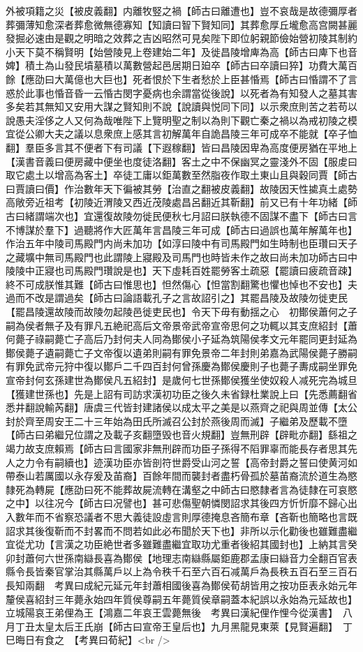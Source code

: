 外被項籍之災【被皮義翻】内離牧竪之禍【師古曰離遭也】豈不哀哉是故德彌厚者葬彌薄知愈深者葬愈微無德寡知【知讀曰智下賢知同】其葬愈厚丘壠愈高宫闕甚麗發掘必速由是觀之明暗之效葬之吉凶昭然可見矣陛下即位躬親節儉始營初陵其制約小天下莫不稱賢明【始營陵見上卷建始二年】及徙昌陵增庳為高【師古曰庳下也音婢】積土為山發民墳墓積以萬數營起邑居期日廹卒【師古曰卒讀曰猝】功費大萬百餘【應劭曰大萬億也大巨也】死者恨於下生者愁於上臣甚惛焉【師古曰惛謂不了言惑於此事也惛音昏一云惛古閔字憂病也余謂當從後說】以死者為有知發人之墓其害多矣若其無知又安用大謀之賢知則不說【說讀與悦同下同】以示衆庶則苦之若苟以說愚夫淫侈之人又何為哉唯陛下上覽明聖之制以為則下觀亡秦之禍以為戒初陵之模宜從公卿大夫之議以息衆庶上感其言初解萬年自詭昌陵三年可成卒不能就【卒子恤翻】羣臣多言其不便者下有司議【下遐稼翻】皆曰昌陵因卑為高度便房猶在平地上【漢書音義曰便房藏中便坐也度徒洛翻】客土之中不保幽冥之靈淺外不固【服䖍曰取它處土以增高為客土】卒徒工庸以鉅萬數至然脂夜作取土東山且與穀同賈【師古曰賈讀曰價】作治數年天下徧被其勞【治直之翻被皮義翻】故陵因天性㨿真土處勢高敞旁近祖考【初陵近渭陵又西近茂陵處昌呂翻近其靳翻】前又已有十年功緒【師古曰緒謂端次也】宜還復故陵勿徙民便秋七月詔曰朕執德不固謀不盡下【師古曰言不博謀於羣下】過聽將作大匠萬年言昌陵三年可成【師古曰過誤也萬年解萬年也】作治五年中陵司馬殿門内尚未加功【如淳曰陵中有司馬殿門如生時制也臣瓚曰天子之藏壙中無司馬殿門也此謂陵上寢殿及司馬門也時皆未作之故曰尚未加功師古曰中陵陵中正寢也司馬殿門瓚說是也】天下虛耗百姓罷勞客土疏惡【罷讀曰疲疏音疎】終不可成朕惟其難【師古曰惟思也】怛然傷心【怛當割翻驚也懼也悼也不安也】夫過而不改是謂過矣【師古曰論語載孔子之言故詔引之】其罷昌陵及故陵勿徙吏民【罷昌陵還故陵而故陵勿起陵邑徙吏民也】令天下毋有動揺之心　初鄼侯蕭何之子嗣為侯者無子及有罪凡五絶祀高后文帝景帝武帝宣帝思何之功輒以其支庶紹封【蕭何薨子祿嗣薨亡子高后乃封何夫人同為鄼侯小子延為筑陽侯孝文元年罷同更封延為鄼侯薨子遺嗣薨亡子文帝復以遺弟則嗣有罪免景帝二年封則弟嘉為武陽侯薨子勝嗣有罪免武帝元狩中復以鄼戶二千四百封何曾孫慶為鄼侯慶則子也薨子夀成嗣坐罪免宣帝封何玄孫建世為鄼侯凡五紹封】是歲何七世孫鄼侯獲坐使奴殺人减死完為城旦【獲建世孫也】先是上詔有司訪求漢初功臣之後久未省録杜業說上曰【先悉薦翻省悉井翻說輸芮翻】唐虞三代皆封建諸侯以成太平之美是以燕齊之祀與周並傳【太公封於齊至周安王二十三年始為田氏所滅召公封於燕後周而滅】子繼弟及歷載不墮【師古曰弟繼兄位謂之及載子亥翻墮毁也音火規翻】豈無刑辟【辟毗亦翻】繇祖之竭力故支庶賴焉【師古曰言國家非無刑辟而功臣子孫得不䧟罪辜而能長存者思其先人之力令有嗣續也】迹漢功臣亦皆剖符世爵受山河之誓【高帝封爵之誓曰使黄河如帶泰山若厲國以永存爰及苖裔】百餘年間而襲封者盡朽骨孤於墓苖裔流於道生為愍隸死為轉屍【應劭曰死不能葬故屍流轉在溝壑之中師古曰愍隸者言為徒隸在可哀愍之中】以往况今【師古曰况譬也】甚可悲傷聖朝憐閔詔求其後四方忻忻靡不歸心出入數年而不省察恐議者不思大義徒設虛言則厚德掩息吝簡布章【吝靳也簡略也言既詔求其後復靳而不封畧而不問若如此必布聞於天下也】非所以示化勸後也雖難盡繼宜從尤功【言漢之功臣絶世者多雖難盡繼宜取功尤重者後紹其國封也】上納其言癸卯封蕭何六世孫南䜌長喜為鄼侯【地理志南䜌縣屬鉅鹿郡孟康曰䜌音力全翻百官表縣令長皆秦官掌治其縣萬戶以上為令秩千石至六百石减萬戶為長秩五百石至三百石長知兩翻　考異曰成紀元延元年封蕭相國後喜為鄼侯荀胡皆用之按功臣表永始元年釐侯喜紹封三年薨永始四年質侯尊嗣五年薨質侯章嗣蓋本紀誤以永始為元延故也】　立城陽哀王弟俚為王【鴻嘉二年哀王雲薨無後　考異曰漢紀俚作悝今從漢書】　八月丁丑太皇太后王氏崩【師古曰宣帝王皇后也】九月黑龍見東萊【見賢遍翻】　丁巳晦日有食之　【考異曰荀紀】<br />
